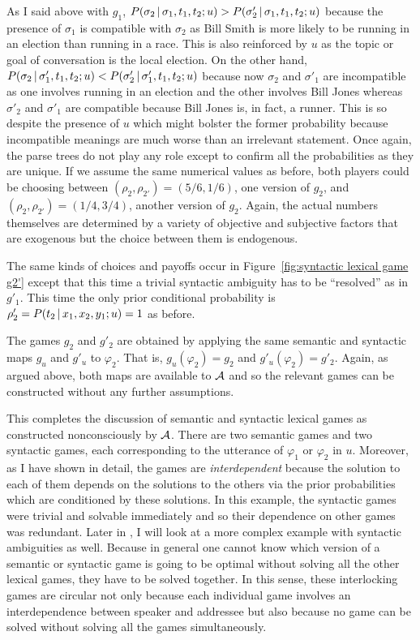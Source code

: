 As I said above with $g_1$, $P(\sigma_2 \,|\, \sigma_1, t_1, t_2; u) > P(\sigma'_2 \,|\, \sigma_1, t_1, t_2; u)$ because the presence of $\sigma_1$ is compatible with $\sigma_2$ as Bill Smith is more likely to be running in an election than running in a race. This is also reinforced by $u$ as the topic or goal of conversation is the local election. On the other hand, $P(\sigma_2 \,|\, \sigma'_1, t_1, t_2; u) < P(\sigma'_2 \,|\, \sigma'_1, t_1, t_2; u)$ because now $\sigma_2$ and $\sigma'_1$ are incompatible as one involves running in an election and the other involves Bill Jones whereas $\sigma'_2$ and $\sigma'_1$ are compatible because Bill Jones is, in fact, a runner. This is so despite the presence of $u$ which might bolster the former probability because incompatible meanings are much worse than an irrelevant statement. Once again, the parse trees do not play any role except to confirm all the probabilities as they are unique. If we assume the same numerical values as before, both players could be choosing between $(\rho_2, \rho_{2'}) = (5/6,1/6)$, one version of $g_2$, and $(\rho_2, \rho_{2'}) = (1/4,3/4)$, another version of $g_2$. Again, the actual numbers themselves are determined by a variety of objective and subjective factors that are exogenous but the choice between them is endogenous.

The same kinds of choices and payoffs occur in Figure~\ref{fig:syntactic lexical game g2'} except that this time a trivial syntactic ambiguity has to be ``resolved'' as in $g'_1$. This time the only prior conditional probability is $\rho'_2 = P(t_2 \,|\, x_1, x_2, y_1; u) = 1$ as before.

The games $g_2$ and $g'_2$ are obtained by applying the same semantic and syntactic maps $g_u$ and $g'_u$ to $\varphi_2$. That is, $g_u(\varphi_2) = g_2$ and $g'_u(\varphi_2) = g'_2$. Again, as argued above, both maps are available to $\cal A$ and so the relevant games can be constructed without any further assumptions.

This completes the discussion of semantic and syntactic lexical games as constructed nonconsciously by $\cal A$. There are two semantic games and two syntactic games, each corresponding to the utterance of $\varphi_1$ or $\varphi_2$ in $u$. Moreover, as I have shown in detail, the games are \emph{interdependent} because the solution to each of them depends on the solutions to the others via the prior probabilities which are conditioned by these solutions. In this example, the syntactic games were trivial and solvable immediately and so their dependence on other games was redundant. Later in , I will look at a more complex example with syntactic ambiguities as well. Because in general one cannot know which version of a semantic or syntactic game is going to be optimal without solving all the other lexical games, they have to be solved together. In this sense, these interlocking games are circular not only because each individual game involves an interdependence between speaker and addressee but also because no game can be solved without solving all the games simultaneously. 

